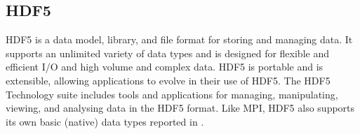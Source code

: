 \subsection{HDF5}


HDF5 is a data model, library, and file format for storing and managing data. It supports an unlimited variety of data types and is designed for flexible and efficient I/O and high volume and complex data.
HDF5 is portable and is extensible, allowing applications to evolve in their use of HDF5.
The HDF5 Technology suite includes tools and applications for managing, manipulating, viewing, and analysing data in the HDF5 format. Like MPI, HDF5 also supports its own basic (native) data types reported in .

